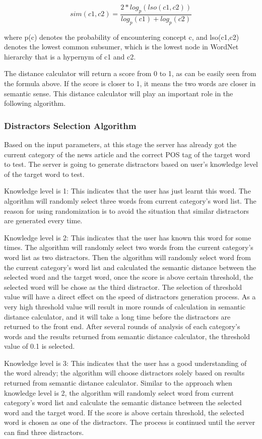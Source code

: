 \begin{equation}
sim(c1,c2) = \frac{2*log_p(lso(c1,c2))}{log_p(c1)+log_p(c2)}
\label{equation:Distractor_4}
\end{equation}  

where p(c) denotes the probability of encountering concept c, and lso(c1,c2) denotes the lowest common subsumer, which is the lowest node in WordNet hierarchy that is a hypernym of c1 and c2. 

The distance calculator will return a score from 0 to 1, as can be easily seen from the formula above. If the score is closer to 1, it means the two words are closer in semantic sense. This distance calculator will play an important role in the following algorithm. 

\subsubsection{Distractors Selection Algorithm}
Based on the input parameters, at this stage the server has already got the current category of the news article and the correct POS tag of the target word to test. The server is going to generate distractors based on user’s knowledge level of the target word to test.

Knowledge level is 1: This indicates that the user has just learnt this word. The algorithm will randomly select three words from current category’s word list. The reason for using randomization is to avoid the situation that similar distractors are generated every time.

Knowledge level is 2: This indicates that the user has known this word for some times. The algorithm will randomly select two words from the current category’s word list as two distractors. Then the algorithm will randomly select word from the current category’s word list and calculated the semantic distance between the selected word and the target word, once the score is above certain threshold, the selected word will be chose as the third distractor. The selection of threshold value will have a direct effect on the speed of distractors generation process. As a very high threshold value will result in more rounds of calculation in semantic distance calculator, and it will take a long time before the distractors are returned to the front end. After several rounds of analysis of each category’s words and the results returned from semantic distance calculator, the threshold value of 0.1 is selected.

Knowledge level is 3: This indicates that the user has a good understanding of the word already; the algorithm will choose distractors solely based on results returned from semantic distance calculator. Similar to the approach when knowledge level is 2, the algorithm will randomly select word from current category’s word list and calculate the semantic distance between the selected word and the target word. If the score is above certain threshold, the selected word is chosen as one of the distractors. The process is continued until the server can find three distractors. 


